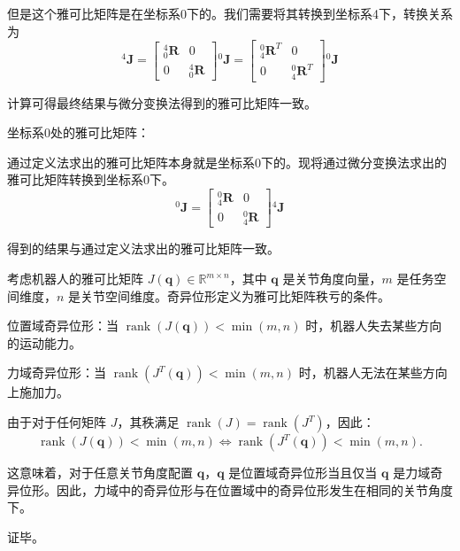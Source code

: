 \documentclass{homework}
\begin{document}
\begin{sol}
但是这个雅可比矩阵是在坐标系{0}下的。我们需要将其转换到坐标系{4}下，转换关系为
\[
  {^4}\mathbf{J} =
  \begin{bmatrix}
    {^4_0}\mathbf{R} & 0 \\
    0 & {^4_0}\mathbf{R}
  \end{bmatrix}
  {^0}\mathbf{J} =
  \begin{bmatrix}
    {^0_4}\mathbf{R}^T & 0 \\
    0 & {^0_4}\mathbf{R}^T
  \end{bmatrix}
  {^0}\mathbf{J}
\]

计算可得最终结果与微分变换法得到的雅可比矩阵一致。

坐标系{0}处的雅可比矩阵：

通过定义法求出的雅可比矩阵本身就是坐标系{0}下的。现将通过微分变换法求出的雅可比矩阵转换到坐标系{0}下。
\[
  {^0}\mathbf{J} =
  \begin{bmatrix}
    {^0_4}\mathbf{R} & 0 \\
    0 & {^0_4}\mathbf{R}
  \end{bmatrix}
  {^4}\mathbf{J}
\]

得到的结果与通过定义法求出的雅可比矩阵一致。

\end{sol}

\question

\begin{sol}

考虑机器人的雅可比矩阵 \( J(\mathbf{q}) \in \mathbb{R}^{m \times n} \)，其中 \( \mathbf{q} \) 是关节角度向量，\( m \) 是任务空间维度，\( n \) 是关节空间维度。奇异位形定义为雅可比矩阵秩亏的条件。

位置域奇异位形：当 \( \operatorname{rank}(J(\mathbf{q})) < \min(m, n) \) 时，机器人失去某些方向的运动能力。

力域奇异位形：当 \( \operatorname{rank}(J^T(\mathbf{q})) < \min(m, n) \) 时，机器人无法在某些方向上施加力。

由于对于任何矩阵 \( J \)，其秩满足 \( \operatorname{rank}(J) = \operatorname{rank}(J^T) \)，因此：
\[
\operatorname{rank}(J(\mathbf{q})) < \min(m, n) \iff \operatorname{rank}(J^T(\mathbf{q})) < \min(m, n).
\]

这意味着，对于任意关节角度配置 \( \mathbf{q} \)，\( \mathbf{q} \) 是位置域奇异位形当且仅当 \( \mathbf{q} \) 是力域奇异位形。因此，力域中的奇异位形与在位置域中的奇异位形发生在相同的关节角度下。

证毕。

\end{sol}
\end{document}
